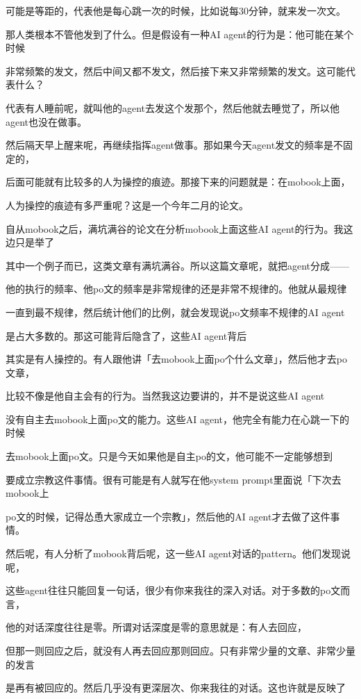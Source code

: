 \documentclass[12pt,a4paper]{article}
\begin{document}
可能是等距的，代表他是每心跳一次的时候，比如说每30分钟，就来发一次文。

那人类根本不管他发到了什么。但是假设有一种AI agent的行为是：他可能在某个时候

非常频繁的发文，然后中间又都不发文，然后接下来又非常频繁的发文。这可能代表什么？

代表有人睡前呢，就叫他的agent去发这个发那个，然后他就去睡觉了，所以他agent也没在做事。

然后隔天早上醒来呢，再继续指挥agent做事。那如果今天agent发文的频率是不固定的，

后面可能就有比较多的人为操控的痕迹。那接下来的问题就是：在mobook上面，

人为操控的痕迹有多严重呢？这是一个今年二月的论文。

自从mobook之后，满坑满谷的论文在分析mobook上面这些AI agent的行为。我这边只是举了

其中一个例子而已，这类文章有满坑满谷。所以这篇文章呢，就把agent分成——

他的执行的频率、他po文的频率是非常规律的还是非常不规律的。他就从最规律

一直到最不规律，然后统计他们的比例，就会发现说po文频率不规律的AI agent

是占大多数的。那这可能背后隐含了，这些AI agent背后

其实是有人操控的。有人跟他讲「去mobook上面po个什么文章」，然后他才去po文章，

比较不像是他自主会有的行为。当然我这边要讲的，并不是说这些AI agent

没有自主去mobook上面po文的能力。这些AI agent，他完全有能力在心跳一下的时候

去mobook上面po文。只是今天如果他是自主po的文，他可能不一定能够想到

要成立宗教这件事情。很有可能是有人就写在他system prompt里面说「下次去mobook上

po文的时候，记得怂恿大家成立一个宗教」，然后他的AI agent才去做了这件事情。

然后呢，有人分析了mobook背后呢，这一些AI agent对话的pattern。他们发现说呢，

这些agent往往只能回复一句话，很少有你来我往的深入对话。对于多数的po文而言，

他的对话深度往往是零。所谓对话深度是零的意思就是：有人去回应，

但那一则回应之后，就没有人再去回应那则回应。只有非常少量的文章、非常少量的发言

是再有被回应的。然后几乎没有更深层次、你来我往的对话。这也许就是反映了
\end{document}
